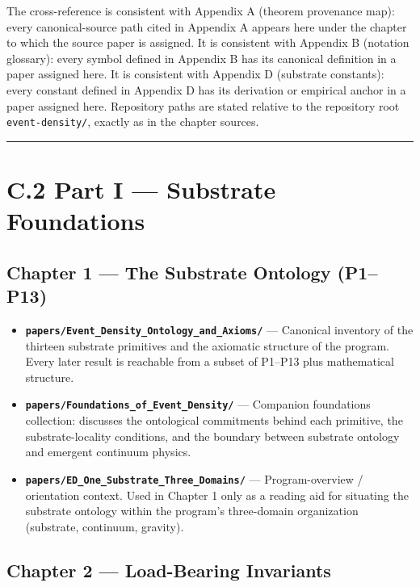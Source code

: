 \documentclass[11pt]{book}
\begin{document}
The cross-reference is consistent with Appendix A (theorem provenance map): every canonical-source path cited in Appendix A appears here under the chapter to which the source paper is assigned. It is consistent with Appendix B (notation glossary): every symbol defined in Appendix B has its canonical definition in a paper assigned here. It is consistent with Appendix D (substrate constants): every constant defined in Appendix D has its derivation or empirical anchor in a paper assigned here. Repository paths are stated relative to the repository root \texttt{event-density/}, exactly as in the chapter sources.

\bigskip\hrule\bigskip

\section{C.2 Part I — Substrate Foundations}

\subsection{Chapter 1 — The Substrate Ontology (P1–P13)}

\begin{itemize}
\item \textbf{\texttt{papers/Event\_Density\_Ontology\_and\_Axioms/}} — Canonical inventory of the thirteen substrate primitives and the axiomatic structure of the program. Every later result is reachable from a subset of P1–P13 plus mathematical structure.
\item \textbf{\texttt{papers/Foundations\_of\_Event\_Density/}} — Companion foundations collection: discusses the ontological commitments behind each primitive, the substrate-locality conditions, and the boundary between substrate ontology and emergent continuum physics.
\item \textbf{\texttt{papers/ED\_One\_Substrate\_Three\_Domains/}} — Program-overview / orientation context. Used in Chapter 1 only as a reading aid for situating the substrate ontology within the program's three-domain organization (substrate, continuum, gravity).
\end{itemize}

\subsection{Chapter 2 — Load-Bearing Invariants}
\end{document}
